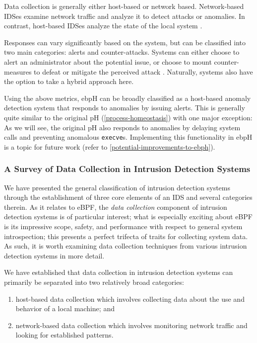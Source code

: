 \documentclass[
  12pt]{findlay}
\begin{document}
Data collection is generally either host-based or network based.
Network-based IDSes examine network traffic and analyze it to detect
attacks or anomalies. In contrast, host-based IDSes analyze the state of
the local system \autocite{kemmerer02,soma02}.

Responses can vary significantly based on the system, but can be
classified into two main categories: alerts and counter-attacks. Systems
can either choose to alert an administrator about the potential issue,
or choose to mount counter-measures to defeat or mitigate the perceived
attack \autocite{kemmerer02}. Naturally, systems also have the option to
take a hybrid approach here.

Using the above metrics, ebpH can be broadly classified as a host-based
anomaly detection system that responds to anomalies by issuing alerts.
This is generally quite similar to the original pH
(\autoref{process-homeostasis}) with one major exception: As we will
see, the original pH also responds to anomalies by delaying system calls
\autocite{soma02} and preventing anomalous
\passthrough{\lstinline!execve!}s. Implementing this functionality in
ebpH is a topic for future work (refer to
\autoref{potential-improvements-to-ebph}).

\hypertarget{a-survey-of-data-collection-in-intrusion-detection-systems}{%
\subsubsection{A Survey of Data Collection in Intrusion Detection
Systems}\label{a-survey-of-data-collection-in-intrusion-detection-systems}}

We have presented the general classification of intrusion detection
systems through the establishment of three core elements of an IDS and
several categories therein. As it relates to eBPF, the \emph{data
collection} component of intrusion detection systems is of particular
interest; what is especially exciting about eBPF is its impressive
scope, safety, and performance with respect to general system
introspection; this presents a perfect trifecta of traits for collecting
system data. As such, it is worth examining data collection techniques
from various intrusion detection systems in more detail.

We have established that data collection in intrusion detection systems
can primarily be separated into two relatively broad categories:

\begin{enumerate}
\def\labelenumi{(\arabic{enumi})}
\tightlist
\item
  host-based data collection which involves collecting data about the
  use and behavior of a local machine; and
\item
  network-based data collection which involves monitoring network
  traffic and looking for established patterns.
\end{enumerate}
\end{document}
